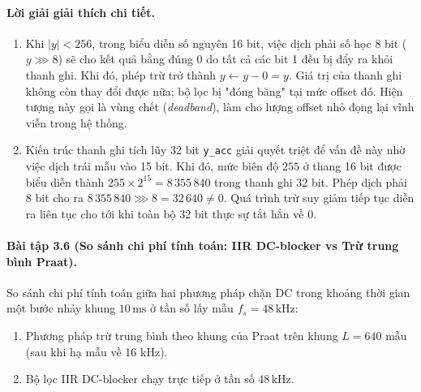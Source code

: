 \paragraph{Lời giải giải thích chi tiết.}
\begin{enumerate}[label=\alph*)]
    \item Khi $|y| < 256$, trong biểu diễn số nguyên 16 bit, việc dịch phải số học 8 bit ($y \ggg 8$) sẽ cho kết quả bằng đúng $0$ do tất cả các bit 1 đều bị đẩy ra khỏi thanh ghi. Khi đó, phép trừ trở thành $y \leftarrow y - 0 = y$. Giá trị của thanh ghi không còn thay đổi được nữa; bộ lọc bị "đóng băng" tại mức offset đó. Hiện tượng này gọi là vùng chết (\emph{deadband}), làm cho lượng offset nhỏ đọng lại vĩnh viễn trong hệ thống.
    \item Kiến trúc thanh ghi tích lũy 32 bit \texttt{y\_acc} giải quyết triệt để vấn đề này nhờ việc dịch trái mẫu vào 15 bit. Khi đó, mức biên độ $255$ ở thang 16 bit được biểu diễn thành $255 \times 2^{15} = 8\,355\,840$ trong thanh ghi 32 bit. Phép dịch phải 8 bit cho ra $8\,355\,840 \ggg 8 = 32\,640 \neq 0$. Quá trình trừ suy giảm tiếp tục diễn ra liên tục cho tới khi toàn bộ 32 bit thực sự tắt hẳn về 0.
\end{enumerate}

\paragraph{Bài tập 3.6 (So sánh chi phí tính toán: IIR DC-blocker vs Trừ trung bình Praat).}
So sánh chi phí tính toán giữa hai phương pháp chặn DC trong khoảng thời gian một bước nhảy khung $10\,\text{ms}$ ở tần số lấy mẫu $f_s = 48\,\text{kHz}$:
\begin{enumerate}[label=\alph*)]
    \item Phương pháp trừ trung bình theo khung của Praat trên khung $L = 640$ mẫu (sau khi hạ mẫu về 16 kHz).
    \item Bộ lọc IIR DC-blocker chạy trực tiếp ở tần số $48\,\text{kHz}$.
\end{enumerate}

